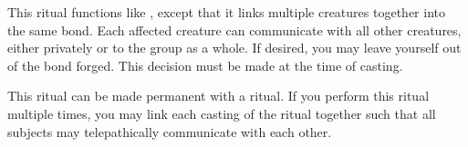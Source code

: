 \begin{spelleffect}
  This ritual functions like , except that it links multiple creatures together into the same bond. Each affected creature can communicate with all other creatures, either privately or to the group as a whole. If desired, you may leave yourself out of the bond forged. This decision must be made at the time of casting.
\end{spelleffect}
\begin{spellnotes}
This ritual can be made permanent with a  ritual. If you perform this ritual multiple times, you may link each casting of the ritual together such that all subjects may telepathically communicate with each other. 
\end{spellnotes}

